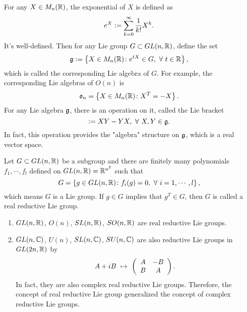 \documentclass[suri,pdfbookmark]{engsuribt} %
\begin{document}
  For any $X \in M_n(\mathbb{R})$, the exponential of $X$ is defined as
  \begin{equation*}
    e^X \vcentcolon= \sum_{k=0}^{\infty} \frac{1}{k!} X^k.
  \end{equation*}
  It's well-defined. Then for any Lie group $G \subset GL(n,\mathbb{R})$, define the set
  \begin{equation*}
    \mathfrak{g} \vcentcolon= \left\{X \in M_n(\mathbb{R}) \colon e^{tX} \in G,~\forall~t \in \mathbb{R}\right\},
  \end{equation*}
  which is called the corresponding Lie algebra of $G$. For example, the corresponding Lie algebras of $O(n)$ is
  \begin{equation*}
    \mathfrak{o}_n = \left\{X \in M_n(\mathbb{R}) \colon X^T = -X\right\}.
  \end{equation*}
  For any Lie algebra $\mathfrak{g}$, there is an operation on it, called the Lie bracket
  \begin{equation*}
    [X,Y] \defeq XY-YX,~\forall~X,Y \in \alg{g}.
  \end{equation*}
  In fact, this operation provides the "algebra" structure on $\mathfrak{g}$, which is a real vector space.

  \begin{defn}
    Let $G \subset GL(n,\mathbb{R})$ be a subgroup and there are finitely many polynomials $f_1,\cdots,f_l$ defined on $GL(n,\mathbb{R}) = \mathbb{R}^{n^2}$ such that
    \begin{equation*}
      G = \left\{g \in GL(n,\mathbb{R}) \colon f_i(g) = 0,~\forall~i=1,\cdots,l\right\},
    \end{equation*} 
    which means $G$ is a Lie group. If $g \in G$ implies that $g^T \in G$, then $G$ is called a real reductive Lie group.  
  \end{defn}

  \begin{exam}
    \begin{enumerate}
      \item $GL(n,\mathbb{R})$, $O(n)$, $SL(n,\mathbb{R})$, $SO(n,\mathbb{R})$ are real reductive Lie groups.
      \item $GL(n,\mathbb{C})$, $U(n)$, $SL(n,\mathbb{C})$, $SU(n,\mathbb{C})$ are also reductive Lie groups in $GL(2n,\mathbb{R})$ by
      \begin{equation*}
        A+iB ~\mapsto~ \left(
          \begin{array}{cc}
            A & -B \\
            B & A
          \end{array}
        \right).
      \end{equation*}
      In fact, they are also complex real reductive Lie groups. Therefore, the concept of real reductive Lie group generalized the concept of complex reductive Lie groups.
    \end{enumerate}
  \end{exam}
\end{document}
